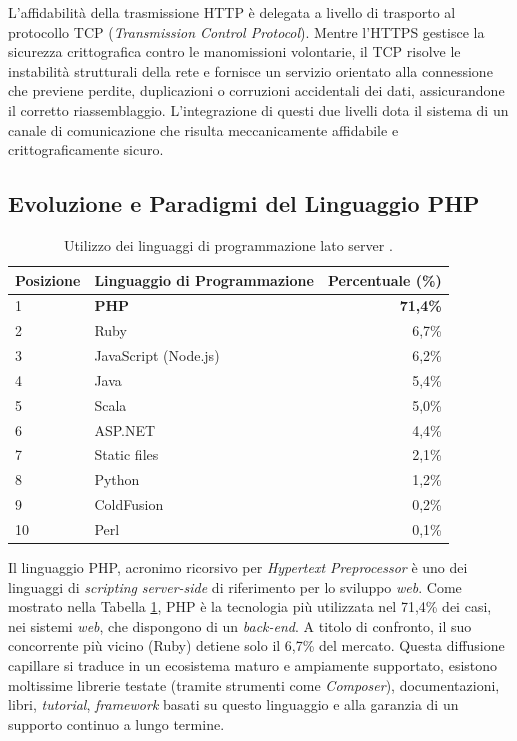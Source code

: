 L'affidabilità della trasmissione HTTP è delegata a livello di trasporto al protocollo TCP (\textit{Transmission Control Protocol}). Mentre l'HTTPS gestisce la sicurezza crittografica contro le manomissioni volontarie, il TCP risolve le instabilità strutturali della rete e fornisce un servizio orientato alla connessione che previene perdite, duplicazioni o corruzioni accidentali dei dati, assicurandone il corretto riassemblaggio. L'integrazione di questi due livelli dota il sistema di un canale di comunicazione che risulta meccanicamente affidabile e crittograficamente sicuro.

\subsection{Evoluzione e Paradigmi del Linguaggio PHP}
\begin{table}[t]
	\centering
	\begin{tabular}{llr}
		\toprule
		\textbf{Posizione} & \textbf{Linguaggio di Programmazione} & \textbf{Percentuale (\%)} \\
		\midrule
		1  & \textbf{PHP}           & \textbf{71,4\%} \\
		2  & Ruby                  & 6,7\%           \\
		3  & JavaScript (Node.js)  & 6,2\%           \\
		4  & Java                  & 5,4\%           \\
		5  & Scala                 & 5,0\%           \\
		6  & ASP.NET               & 4,4\%           \\
		7  & Static files          & 2,1\%           \\
		8  & Python                & 1,2\%           \\
		9  & ColdFusion            & 0,2\%           \\
		10 & Perl                  & 0,1\%           \\
		\bottomrule
	
	\end{tabular}
	\caption{Utilizzo dei linguaggi di programmazione lato server \autocite{UsageStatisticsMarket}.}
	\label{tab:w3techs_languages}
\end{table}
Il linguaggio PHP, acronimo ricorsivo per \textit{Hypertext Preprocessor} è uno dei linguaggi di \textit{scripting} \textit{server-side} di riferimento per lo sviluppo \textit{web}. 
Come mostrato nella Tabella \ref{tab:w3techs_languages}, PHP è la tecnologia più utilizzata nel 71,4\% dei casi, nei sistemi \textit{web}, che dispongono di un \textit{back-end}. A titolo di confronto, il suo concorrente più vicino (Ruby) detiene solo il 6,7\% del mercato. Questa diffusione capillare si traduce in un ecosistema maturo e ampiamente supportato, esistono moltissime librerie testate (tramite strumenti come \textit{Composer}), documentazioni, libri, \textit{tutorial}, \textit{framework} basati su questo linguaggio e alla garanzia di un supporto continuo a lungo termine. 

